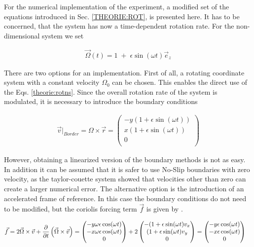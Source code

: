 For the numerical implementation of the experiment, a modified set of the equations
introduced in Sec. \ref{THEORIE:ROT}, is presented here.
It has to be concerned, that the system has now a time-dependent rotation rate.
For the non-dimensional system we set

\begin{align}
    \vec{\Omega}(t) = 1 \; + \; \epsilon \sin(\omega t)\vec{e}_z
\end{align}

There are two options for an implementation.
First of all, a rotating coordinate system with a constant velocity $\Omega_0$ can be chosen.
This enables the direct use of the Eqs. \ref{theorie:rotns}. Since the overall rotation rate of the system is
modulated, it is necessary to introduce the boundary conditions

\begin{align}
    \vec{v}|_{Border}  = \Omega \times \vec{r} = \begin{pmatrix}
           -y ( 1 + \epsilon \sin(\omega t)) \\
            x ( 1 + \epsilon \sin(\omega t)) \\
           0\\
         \end{pmatrix}
\end{align}

However, obtaining a linearized version of the boundary methods is not as easy.
In addition it can be assumed that it is safer to use No-Slip boundaries with zero velocity, as
the taylor-couette system showed that velocities other than zero can create a larger numerical error.
The alternative option is the introduction of an accelerated frame of reference.
In this case the boundary conditions do not need to be modified, but the coriolis forcing term $\vec{f}$ is given by \citep{Tilgner2007}.

\begin{align}
    \vec{f} &= 2 \vec{\Omega} \times \vec{v} + \pdn[]{t}\left(\vec{\Omega} \times \vec{v} \right)
            = \begin{pmatrix}
           -y \omega \epsilon \cos(\omega t) \\
           -x \omega \epsilon \cos(\omega t) \\
           0\\
         \end{pmatrix}
            + 2\begin{pmatrix}
           - ( 1 + \epsilon \sin(\omega t)v_x \\
             ( 1 + \epsilon \sin(\omega t)v_y \\
           0\\
         \end{pmatrix}
            = \begin{pmatrix}
           -y \epsilon \cos(\omega t) \\
           -x \epsilon \cos(\omega t) \\
           0\\
         \end{pmatrix}
\end{align}

